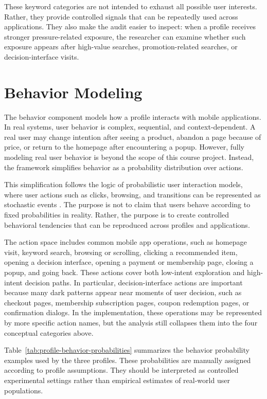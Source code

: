 These keyword categories are not intended to exhaust all possible user interests. Rather, they provide controlled signals that can be repeatedly used across applications. They also make the audit easier to inspect: when a profile receives stronger pressure-related exposure, the researcher can examine whether such exposure appears after high-value searches, promotion-related searches, or decision-interface visits.

\section{Behavior Modeling}

The behavior component models how a profile interacts with mobile applications. In real systems, user behavior is complex, sequential, and context-dependent. A real user may change intention after seeing a product, abandon a page because of price, or return to the homepage after encountering a popup. However, fully modeling real user behavior is beyond the scope of this course project. Instead, the framework simplifies behavior as a probability distribution over actions.

This simplification follows the logic of probabilistic user interaction models, where user actions such as clicks, browsing, and transitions can be represented as stochastic events \cite{chapelle2009clickmodel}. The purpose is not to claim that users behave according to fixed probabilities in reality. Rather, the purpose is to create controlled behavioral tendencies that can be reproduced across profiles and applications.

The action space includes common mobile app operations, such as homepage visit, keyword search, browsing or scrolling, clicking a recommended item, opening a decision interface, opening a payment or membership page, closing a popup, and going back. These actions cover both low-intent exploration and high-intent decision paths. In particular, decision-interface actions are important because many dark patterns appear near moments of user decision, such as checkout pages, membership subscription pages, coupon redemption pages, or confirmation dialogs. In the implementation, these operations may be represented by more specific action names, but the analysis still collapses them into the four conceptual categories above.

Table~\ref{tab:profile-behavior-probabilities} summarizes the behavior probability examples used by the three profiles. These probabilities are manually assigned according to profile assumptions. They should be interpreted as controlled experimental settings rather than empirical estimates of real-world user populations.

